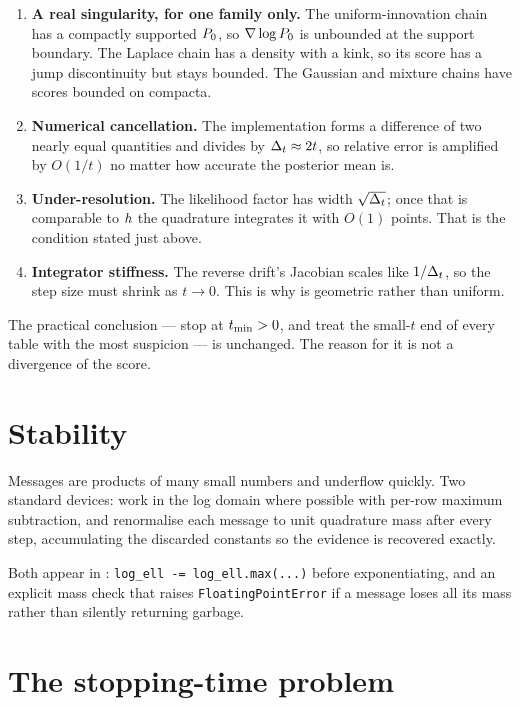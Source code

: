 \begin{enumerate}
\item \textbf{A real singularity, for one family only.} The uniform-innovation chain has a
      compactly supported $P_0$, so $\nabla\log P_0$ is unbounded at the support boundary. The
      Laplace chain has a density with a kink, so its score has a jump discontinuity but stays
      bounded. The Gaussian and mixture chains have scores bounded on compacta.
\item \textbf{Numerical cancellation.} The implementation forms a difference of two nearly
      equal quantities and divides by $\Delta_t\approx2t$, so relative error is amplified by
      $O(1/t)$ no matter how accurate the posterior mean is.
\item \textbf{Under-resolution.} The likelihood factor has width $\sqrt{\Delta_t}$; once that is
      comparable to $h$ the quadrature integrates it with $O(1)$ points. That is the
      condition stated just above.
\item \textbf{Integrator stiffness.} The reverse drift's Jacobian scales like $1/\Delta_t$, so the
      step size must shrink as $t\to0$. This is why  is
      geometric rather than uniform.
\end{enumerate}

\noindent
The practical conclusion --- stop at $t_{\min}>0$, and treat the small-$t$ end of every table with
the most suspicion --- is unchanged. The reason for it is not a divergence of the score.

\section{Stability}

Messages are products of many small numbers and underflow quickly. Two standard devices:
work in the log domain where possible with per-row maximum subtraction, and renormalise each
message to unit quadrature mass after every step, accumulating the discarded constants so the
evidence is recovered exactly.

\begin{codebox}
Both appear in : \texttt{log\_ell -= log\_ell.max(...)}
before exponentiating, and an explicit mass check that raises \texttt{FloatingPointError} if a
message loses all its mass rather than silently returning garbage.
\end{codebox}

\section{The stopping-time problem}
\label{sec:tmin}

